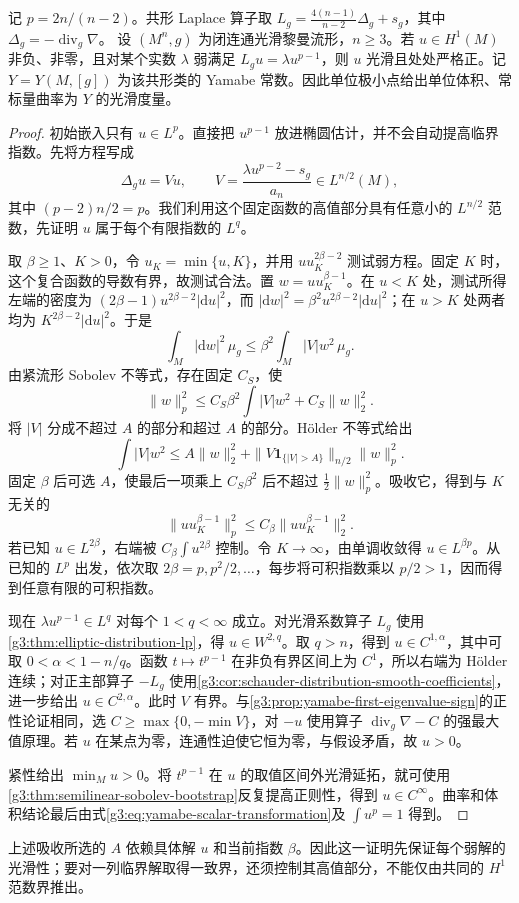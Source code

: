 \begin{theorem}\label{g3:thm:yamabe-weak-regularity}
	记 \(p=2n/(n-2)\)。共形 Laplace 算子取 \(L_g=\tfrac{4(n-1)}{n-2}\Delta_g+s_g\)，其中 \(\Delta_g=-\operatorname{div}_g\nabla\)。
	设 \((M^n,g)\) 为闭连通光滑黎曼流形，\(n\ge3\)。若 \(u\in H^1(M)\) 非负、非零，且对某个实数 \(\lambda\) 弱满足 \(L_gu=\lambda u^{p-1}\)，则 \(u\) 光滑且处处严格正。记 \(Y=Y(M,[g])\) 为该共形类的 Yamabe 常数。因此单位极小点给出单位体积、常标量曲率为 \(Y\) 的光滑度量。
\end{theorem}
\begin{proof}
	初始嵌入只有 \(u\in L^p\)。直接把 \(u^{p-1}\) 放进椭圆估计，并不会自动提高临界指数。先将方程写成
	\[
		\Delta_gu=Vu,\qquad V=\frac{\lambda u^{p-2}-s_g}{a_n}\in L^{n/2}(M),
	\]
	其中 \((p-2)n/2=p\)。我们利用这个固定函数的高值部分具有任意小的 \(L^{n/2}\) 范数，先证明 \(u\) 属于每个有限指数的 \(L^q\)。

	取 \(\beta\ge1\)、\(K>0\)，令 \(u_K=\min\{u,K\}\)，并用 \(u u_K^{2\beta-2}\) 测试弱方程。固定 \(K\) 时，这个复合函数的导数有界，故测试合法。置 \(w=u u_K^{\beta-1}\)。在 \(u<K\) 处，测试所得左端的密度为 \((2\beta-1)u^{2\beta-2}|\mathrm du|^2\)，而 \(|\mathrm dw|^2=\beta^2u^{2\beta-2}|\mathrm du|^2\)；在 \(u>K\) 处两者均为 \(K^{2\beta-2}|\mathrm du|^2\)。于是
	\[
		\int_M|\mathrm dw|^2\,\mu_g\le\beta^2\int_M|V|w^2\,\mu_g.
	\]
	由紧流形 Sobolev 不等式，存在固定 \(C_S\)，使
	\[
		\|w\|_p^2\le C_S\beta^2\int|V|w^2+C_S\|w\|_2^2.
	\]
	将 \(|V|\) 分成不超过 \(A\) 的部分和超过 \(A\) 的部分。Hölder 不等式给出
	\[
		\int|V|w^2\le A\|w\|_2^2+
		\|V\mathbf1_{\{|V|>A\}}\|_{n/2}\|w\|_p^2.
	\]
	固定 \(\beta\) 后可选 \(A\)，使最后一项乘上 \(C_S\beta^2\) 后不超过 \(\tfrac12\|w\|_p^2\)。吸收它，得到与 \(K\) 无关的
	\begin{equation}\label{g3:eq:yamabe-integrability-gain}
		\|u u_K^{\beta-1}\|_p^2\le C_\beta\|u u_K^{\beta-1}\|_2^2.
	\end{equation}
	若已知 \(u\in L^{2\beta}\)，右端被 \(C_\beta\int u^{2\beta}\) 控制。令 \(K\to\infty\)，由单调收敛得 \(u\in L^{\beta p}\)。从已知的 \(L^p\) 出发，依次取 \(2\beta=p,p^2/2,\ldots\)，每步将可积指数乘以 \(p/2>1\)，因而得到任意有限的可积指数。

	现在 \(\lambda u^{p-1}\in L^q\) 对每个 \(1<q<\infty\) 成立。对光滑系数算子 \(L_g\) 使用\cref{g3:thm:elliptic-distribution-lp}，得 \(u\in W^{2,q}\)。取 \(q>n\)，得到 \(u\in C^{1,\alpha}\)，其中可取 \(0<\alpha<1-n/q\)。函数 \(t\mapsto t^{p-1}\) 在非负有界区间上为 \(C^1\)，所以右端为 Hölder 连续；对正主部算子 \(-L_g\) 使用\cref{g3:cor:schauder-distribution-smooth-coefficients}，进一步给出 \(u\in C^{2,\alpha}\)。此时 \(V\) 有界。与\cref{g3:prop:yamabe-first-eigenvalue-sign}的正性论证相同，选 \(C\ge\max\{0,-\min V\}\)，对 \(-u\) 使用算子 \(\operatorname{div}_g\nabla-C\) 的强最大值原理。若 \(u\) 在某点为零，连通性迫使它恒为零，与假设矛盾，故 \(u>0\)。

	紧性给出 \(\min_Mu>0\)。将 \(t^{p-1}\) 在 \(u\) 的取值区间外光滑延拓，就可使用\cref{g3:thm:semilinear-sobolev-bootstrap}反复提高正则性，得到 \(u\in C^\infty\)。曲率和体积结论最后由式\eqref{g3:eq:yamabe-scalar-transformation}及 \(\int u^p=1\) 得到。
\end{proof}

上述吸收所选的 \(A\) 依赖具体解 \(u\) 和当前指数 \(\beta\)。因此这一证明先保证每个弱解的光滑性；要对一列临界解取得一致界，还须控制其高值部分，不能仅由共同的 \(H^1\) 范数界推出。
